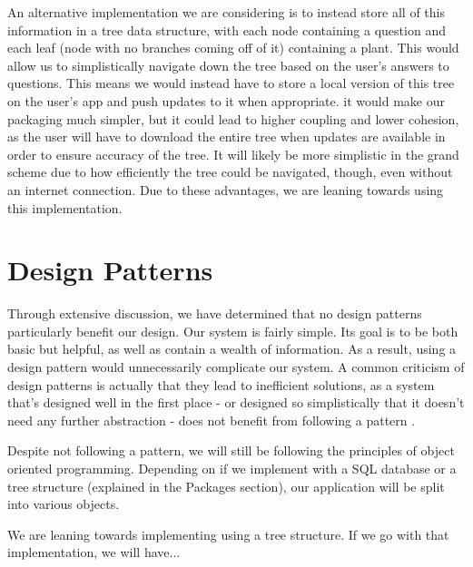 \documentclass[a4paper]{article}
\begin{document}
An alternative implementation we are considering is to instead store all of this information in a tree data structure, with each node containing a question and each leaf (node with no branches coming off of it) containing a plant. This would allow us to simplistically navigate down the tree based on the user's answers to questions. This means we would instead have to store a local version of this tree on the user's app and push updates to it when appropriate. it would make our packaging much simpler, but it could lead to higher coupling and lower cohesion, as the user will have to download the entire tree when updates are available in order to ensure accuracy of the tree. It will likely be more simplistic in the grand scheme due to how efficiently the tree could be navigated, though, even without an internet connection. Due to these advantages, we are leaning towards using this implementation.

\pagebreak

\section{Design Patterns}

Through extensive discussion, we have determined that no design patterns particularly benefit our design. Our system is fairly simple. Its goal is to be both basic but helpful, as well as contain a wealth of information. As a result, using a design pattern would unnecessarily complicate our system. A common criticism of design patterns is actually that they lead to inefficient solutions, as a system that's designed well in the first place - or designed so simplistically that it doesn't need any further abstraction - does not benefit from following a pattern \cite{patterns}. 

Despite not following a pattern, we will still be following the principles of object oriented programming. Depending on if we implement with a SQL database or a tree structure (explained in the Packages section), our application will be split into various objects. 

We are leaning towards implementing using a tree structure. If we go with that implementation, we will have...
\end{document}
